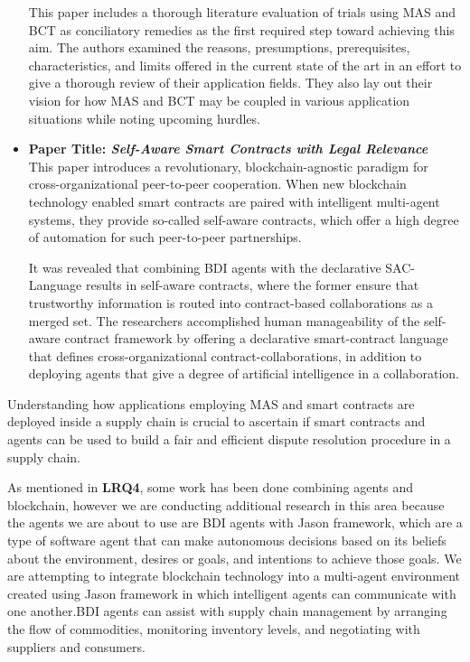 \begin{itemize}[label={}]
\vspace{.5cm}

This paper\cite{literature} includes a thorough literature evaluation of trials using \ac{MAS} and \ac{BCT} as conciliatory remedies as the first required step toward achieving this aim. The authors examined the reasons, presumptions, prerequisites, characteristics, and limits offered in the current state of the art in an effort to give a thorough review of their application fields. They also lay out their vision for how \ac{MAS} and \ac{BCT} may be coupled in various application situations while noting upcoming hurdles.

\vspace{.5cm}

\item \textbf{Paper Title: \textit{Self-Aware Smart Contracts with Legal Relevance}} \\

This paper \cite{sac} introduces a revolutionary, blockchain-agnostic paradigm for cross-organizational peer-to-peer cooperation. When new blockchain technology enabled smart contracts are paired with intelligent multi-agent systems, they provide so-called self-aware contracts, which offer a high degree of automation for such peer-to-peer partnerships.

\vspace{.5cm}

It was revealed that combining \ac{BDI} agents with the declarative SAC-Language results in self-aware contracts, where the former ensure that trustworthy information is routed into contract-based collaborations as a merged set. The researchers accomplished human manageability of the self-aware contract framework by offering a declarative smart-contract language that defines cross-organizational contract-collaborations, in addition to deploying agents that give a degree of artificial intelligence in a collaboration.
\end{itemize}

\vspace{.5cm}

Understanding how applications employing \ac{MAS} and smart contracts are deployed inside a supply chain is crucial to ascertain if smart contracts and agents can be used to build a fair and efficient dispute resolution procedure in a supply chain. 

\vspace{.5cm}

As mentioned in \textbf{LRQ4}, some work has been done combining agents and blockchain, however we are conducting additional research in this area because the agents we are about to use are \ac{BDI} agents with Jason framework, which are a type of software agent that can make autonomous decisions based on its beliefs about the environment, desires or goals, and intentions to achieve those goals. We are attempting to integrate blockchain technology into a multi-agent environment created using Jason framework in which intelligent agents can communicate with one another.\ac{BDI} agents can assist with supply chain management by arranging the flow of commodities, monitoring inventory levels, and negotiating with suppliers and consumers. 


